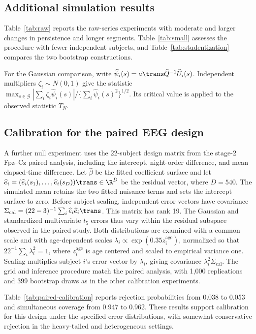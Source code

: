 \subsection{Additional simulation results}
Table~\ref{tab:raw} reports the raw-series experiments with moderate and larger changes in persistence and longer segments. Table~\ref{tab:small} assesses the procedure with fewer independent subjects, and Table~\ref{tab:studentization} compares the two bootstrap constructions.

For the Gaussian comparison, write $\widehat\psi_i(s)=a\trans\widehat Q^{-1}\widehat U_i(s)$. Independent multipliers $\zeta_i\sim N(0,1)$ give the statistic $\max_{s\in\mathcal G}|\sum_i\zeta_i\widehat\psi_i(s)|/\{\sum_i\widehat\psi_i(s)^2\}^{1/2}$. Its critical value is applied to the observed statistic $T_N$.

\FloatBarrier

\subsection{Calibration for the paired EEG design}
A further null experiment uses the 22-subject design matrix from the stage-2 Fpz--Cz paired analysis, including the intercept, night-order difference, and mean elapsed-time difference. Let $\widehat\beta$ be the fitted coefficient surface and let $\widehat e_i=(\widehat e_i(s_1),\ldots,\widehat e_i(s_D))\trans\in\R^D$ be the residual vector, where $D=540$. The simulated mean retains the two fitted nuisance terms and sets the intercept surface to zero. Before subject scaling, independent error vectors have covariance $\Sigma_{\mathrm{cal}}=(22-3)^{-1}\sum_i\widehat e_i\widehat e_i\trans$. This matrix has rank 19. The Gaussian and standardized multivariate $t_5$ errors thus vary within the residual subspace observed in the paired study. Both distributions are examined with a common scale and with age-dependent scales $\lambda_i\propto\exp(0.35z_i^{\mathrm{age}})$, normalized so that $22^{-1}\sum_i\lambda_i^2=1$, where $z_i^{\mathrm{age}}$ is age centered and scaled to empirical variance one. Scaling multiplies subject $i$'s error vector by $\lambda_i$, giving covariance $\lambda_i^2\Sigma_{\mathrm{cal}}$. The grid and inference procedure match the paired analysis, with 1,000 replications and 399 bootstrap draws as in the other calibration experiments.

Table~\ref{tab:paired-calibration} reports rejection probabilities from 0.038 to 0.053 and simultaneous coverage from 0.947 to 0.962. These results support calibration for this design under the specified error distributions, with somewhat conservative rejection in the heavy-tailed and heterogeneous settings.


